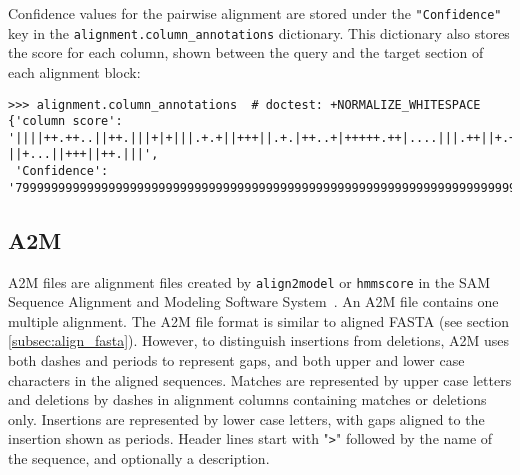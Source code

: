 Confidence values for the pairwise alignment are stored under the \verb|"Confidence"| key in the \verb|alignment.column_annotations| dictionary. This dictionary also stores the score for each column, shown between the query and the target section of each alignment block:
\begin{verbatim}
>>> alignment.column_annotations  # doctest: +NORMALIZE_WHITESPACE
{'column score': '||||++.++..||++.|||+|+|||.+.+||+++||.+.|++..+|+++++.++|....|||.++||+.+.+||+.+||.+++++|+.|+...+++.||++.|||.|||||...+||+.+||+++|++|.+|++.+++++|..+.|||+++-||+...||+++||++.|||',
 'Confidence': '799999999999999999999999999999999999999999999999999999999999999999999999999999999999999999998899999999999999999999999999999999999999999999999999999999999999999999999999986'}
\end{verbatim}

\subsection{A2M}
\label{subsec:align_a2m}

A2M files are alignment files created by \verb+align2model+ or \verb+hmmscore+
in the SAM Sequence Alignment and Modeling Software System~\cite{krogh1994,hughey1996}.  An A2M file contains one multiple alignment. The A2M file format is similar to aligned FASTA (see section \ref{subsec:align_fasta}). However, to distinguish insertions from deletions, A2M uses both dashes and periods to represent gaps, and both upper and lower case characters in the aligned sequences.
Matches are represented by upper case letters and deletions by dashes in alignment columns containing matches or deletions only. Insertions are represented by lower case letters, with gaps aligned to the insertion shown as periods.  Header lines start with "\verb+>+" followed by the name of the sequence, and optionally a description.

